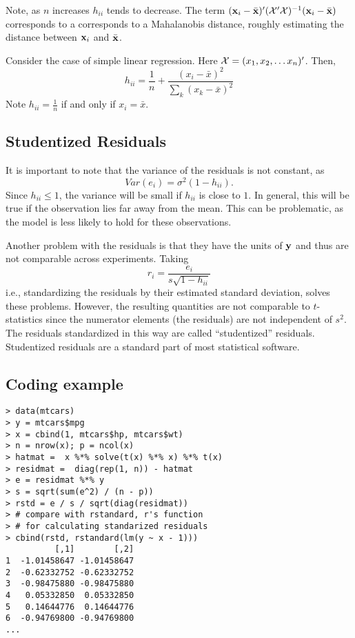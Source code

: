 Note, as $n$ increases $h_{ii}$ tends to decrease.
The term $(\mathbf{x}_i - \bar{\mathbf{x}})' ({\cal X}'{\cal X})^{-1} (\mathbf{x}_i - \bar{\mathbf{x}})$ corresponds to a corresponds to a Mahalanobis distance, roughly estimating the distance between $\mathbf{x}_i$ and  $\bar{\mathbf{x}}$.




\bsexa
Consider the case of simple linear regression.
Here ${\cal X} = (x_1, x_2, \dots x_n)'$.
Then, 
$$\ h_{ii} = \frac{1}{n} + \frac{(x_i-\bar{x})^2}{\sum_k(x_k-\bar{x})^2}\ $$ 
Note $h_{ii} = \frac{1}{n}$ if and only if $x_i = \bar{x}$.
\eexa

\subsection{Studentized Residuals}

It is important to note that the variance of the residuals is not constant, as
$$
Var(e_i) = \sigma^2(1-h_{ii}).
$$ 
Since $h_{ii} \le 1$, the variance will be small if $h_{ii}$ is close to $1$.
In general, this will be true if the observation lies far away from the mean.
This can be problematic, as the model is less likely to hold for these observations.

Another problem with the residuals is that they have the units of $\mathbf{y}$ and thus are
not comparable across experiments. Taking 
$$r_i = \frac{e_i}{s\sqrt{1-h_{ii}}}$$ 
i.e., standardizing the residuals by their estimated standard deviation, solves these problems. However, the resulting quantities are not comparable to
$t$-statistics since the numerator elements (the residuals) are not independent of $s^2$.
The residuals standardized in this way are called ``studentized'' residuals. 
Studentized residuals are a standard part of most statistical software.

\subsection{Coding example}
\begin{verbatim}
> data(mtcars)
> y = mtcars$mpg
> x = cbind(1, mtcars$hp, mtcars$wt)
> n = nrow(x); p = ncol(x)
> hatmat =  x %*% solve(t(x) %*% x) %*% t(x)
> residmat =  diag(rep(1, n)) - hatmat
> e = residmat %*% y
> s = sqrt(sum(e^2) / (n - p))
> rstd = e / s / sqrt(diag(residmat))
> # compare with rstandard, r's function
> # for calculating standarized residuals
> cbind(rstd, rstandard(lm(y ~ x - 1)))
          [,1]        [,2]
1  -1.01458647 -1.01458647
2  -0.62332752 -0.62332752
3  -0.98475880 -0.98475880
4   0.05332850  0.05332850
5   0.14644776  0.14644776
6  -0.94769800 -0.94769800
...
\end{verbatim}

